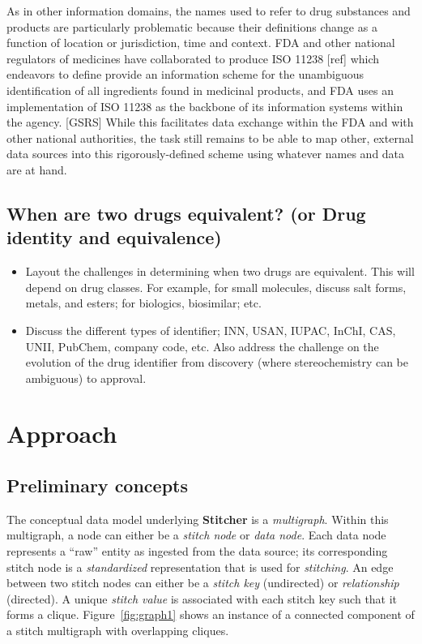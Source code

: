 \documentclass{bioinfo}
\newcommand\st{\textbf{Stitcher}}
\begin{document}
As in other information domains, the names used to refer to drug substances and products are particularly problematic because their definitions change as a function of location or jurisdiction, time and context. FDA and other national regulators of medicines have collaborated to produce ISO 11238 [ref] which endeavors to define provide an information scheme for the unambiguous identification of all ingredients found in medicinal products, and FDA uses an implementation of ISO 11238 as the backbone of its information systems within the agency. [GSRS] While this facilitates data exchange within the FDA and with other national authorities, the task still remains to be able to map other, external data sources into this rigorously-defined scheme using whatever names and data are at hand.

\subsection{When are two drugs equivalent? (or Drug identity and equivalence)}
\begin{itemize}
\item Layout the challenges in determining when two drugs are equivalent. This will depend on drug classes. For example, for small molecules, discuss salt forms, metals, and esters; for biologics, biosimilar; etc.
\item Discuss the different types of identifier; INN, USAN, IUPAC, InChI, CAS, UNII, PubChem, company code, etc. Also address the challenge on the evolution of the drug identifier from discovery (where stereochemistry can be ambiguous) to approval.
\end{itemize}


\section{Approach}

\subsection{Preliminary concepts}
The conceptual data model underlying \st{} is a \emph{multigraph}. Within this multigraph, a node can either be a \emph{stitch node} or \emph{data node}. Each data node represents a ``raw'' entity as ingested from the data source; its corresponding stitch node is a \emph{standardized} representation that is used for \emph{stitching}. An edge between two stitch nodes can either be a \emph{stitch key} (undirected) or \emph{relationship} (directed). A unique \emph{stitch value} is associated with each stitch key such that it forms a clique. Figure~\ref{fig:graph1} shows an instance of a connected component of a stitch multigraph with overlapping cliques.
\end{document}
